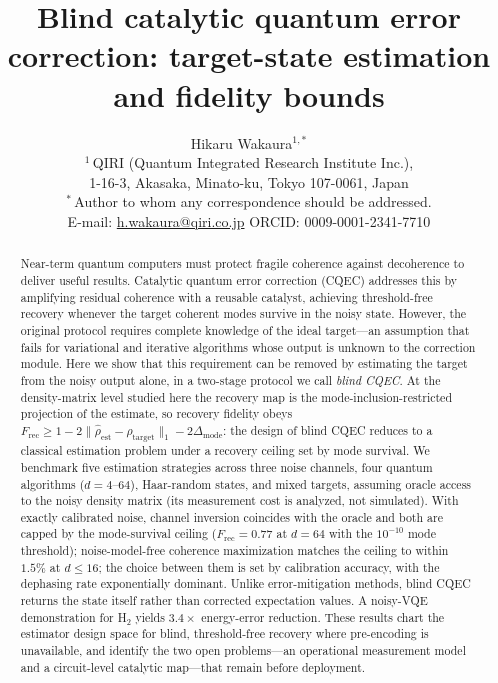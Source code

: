 \documentclass[12pt,a4paper]{article}
\newcommand{\Frec}{F_\mathrm{rec}}
\newcommand{\rhot}{\rho_\mathrm{target}}
\newcommand{\rhoe}{\hat{\rho}_\mathrm{est}}
\begin{document}
\title{Blind catalytic quantum error correction: target-state estimation and fidelity bounds}

\author{Hikaru Wakaura$^{1,*}$\\[0.6em]
\small $^{1}$\,QIRI (Quantum Integrated Research Institute Inc.),\\
\small 1-16-3, Akasaka, Minato-ku, Tokyo 107-0061, Japan\\[0.3em]
\small $^{*}$\,Author to whom any correspondence should be addressed.\\
\small E-mail: \href{mailto:h.wakaura@qiri.co.jp}{h.wakaura@qiri.co.jp} \quad ORCID: 0009-0001-2341-7710}
\date{}
\maketitle

\begin{abstract}
Near-term quantum computers must protect fragile coherence against decoherence to deliver useful results.
Catalytic quantum error correction (CQEC) addresses this by amplifying residual coherence with a reusable catalyst, achieving threshold-free recovery whenever the target coherent modes survive in the noisy state.
However, the original protocol requires complete knowledge of the ideal target---an assumption that fails for variational and iterative algorithms whose output is unknown to the correction module.
Here we show that this requirement can be removed by estimating the target from the noisy output alone, in a two-stage protocol we call \emph{blind CQEC}.
At the density-matrix level studied here the recovery map is the mode-inclusion-restricted projection of the estimate, so recovery fidelity obeys $\Frec \geq 1 - 2\|\rhoe - \rhot\|_1 - 2\Delta_\mathrm{mode}$: the design of blind CQEC reduces to a classical estimation problem under a recovery ceiling set by mode survival.
We benchmark five estimation strategies across three noise channels, four quantum algorithms ($d = 4$--$64$), Haar-random states, and mixed targets, assuming oracle access to the noisy density matrix (its measurement cost is analyzed, not simulated).
With exactly calibrated noise, channel inversion coincides with the oracle and both are capped by the mode-survival ceiling ($\Frec = 0.77$ at $d = 64$ with the $10^{-10}$ mode threshold); noise-model-free coherence maximization matches the ceiling to within $1.5\%$ at $d \leq 16$; the choice between them is set by calibration accuracy, with the dephasing rate exponentially dominant.
Unlike error-mitigation methods, blind CQEC returns the state itself rather than corrected expectation values.
A noisy-VQE demonstration for H$_2$ yields $3.4\times$ energy-error reduction.
These results chart the estimator design space for blind, threshold-free recovery where pre-encoding is unavailable, and identify the two open problems---an operational measurement model and a circuit-level catalytic map---that remain before deployment.
\end{abstract}
\end{document}
